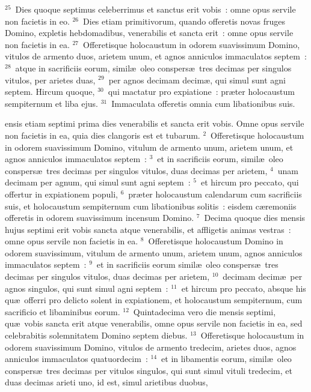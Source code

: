 ${}^{25}$~Dies quoque septimus celeberrimus et sanctus erit vobis~: omne opus servile non facietis in eo.
${}^{26}$~Dies etiam primitivorum, quando offeretis novas fruges Domino, expletis hebdomadibus, venerabilis et sancta erit~: omne opus servile non facietis in ea.
${}^{27}$~Offeretisque holocaustum in odorem suavissimum Domino, vitulos de armento duos, arietem unum, et agnos anniculos immaculatos septem~:
${}^{28}$~atque in sacrificiis eorum, simil\ae\ oleo conspers\ae\ tres decimas per singulos vitulos, per arietes duas,
${}^{29}$~per agnos decimam decim\ae , qui simul sunt agni septem. Hircum quoque,
${}^{30}$~qui mactatur pro expiatione~: pr\ae ter holocaustum sempiternum et liba ejus.
${}^{31}$~Immaculata offeretis omnia cum libationibus suis.

\bchapter
{}ensis etiam septimi prima dies venerabilis et sancta erit vobis. Omne opus servile non facietis in ea, quia dies clangoris est et tubarum.
${}^{2}$~Offeretisque holocaustum in odorem suavissimum Domino, vitulum de armento unum, arietem unum, et agnos anniculos immaculatos septem~:
${}^{3}$~et in sacrificiis eorum, simil\ae\ oleo conspers\ae\ tres decimas per singulos vitulos, duas decimas per arietem,
${}^{4}$~unam decimam per agnum, qui simul sunt agni septem~:
${}^{5}$~et hircum pro peccato, qui offertur in expiationem populi,
${}^{6}$~pr\ae ter holocaustum calendarum cum sacrificiis suis, et holocaustum sempiternum cum libationibus solitis~: eisdem c\ae remoniis offeretis in odorem suavissimum incensum Domino.
${}^{7}$~Decima quoque dies mensis hujus septimi erit vobis sancta atque venerabilis, et affligetis animas vestras~: omne opus servile non facietis in ea.
${}^{8}$~Offeretisque holocaustum Domino in odorem suavissimum, vitulum de armento unum, arietem unum, agnos anniculos immaculatos septem~:
${}^{9}$~et in sacrificiis eorum simil\ae\ oleo conspers\ae\ tres decimas per singulos vitulos, duas decimas per arietem,
${}^{10}$~decimam decim\ae\ per agnos singulos, qui sunt simul agni septem~:
${}^{11}$~et hircum pro peccato, absque his qu\ae\ offerri pro delicto solent in expiationem, et holocaustum sempiternum, cum sacrificio et libaminibus eorum.
${}^{12}$~Quintadecima vero die mensis septimi, qu\ae\ vobis sancta erit atque venerabilis, omne opus servile non facietis in ea, sed celebrabitis solemnitatem Domino septem diebus.
${}^{13}$~Offeretisque holocaustum in odorem suavissimum Domino, vitulos de armento tredecim, arietes duos, agnos anniculos immaculatos quatuordecim~:
${}^{14}$~et in libamentis eorum, simil\ae\ oleo conspers\ae\ tres decimas per vitulos singulos, qui sunt simul vituli tredecim, et duas decimas arieti uno, id est, simul arietibus duobus,
